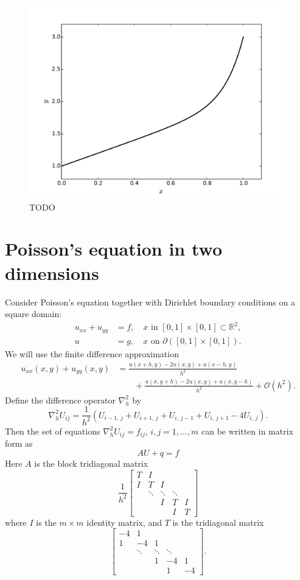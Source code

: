 \begin{figure}[ht]
\centering
\includegraphics[width=12cm]{figure2.pdf}
\caption{TODO}
\label{figure2}
\end{figure}



\section{Poisson's equation in two dimensions}

 Consider Poisson's equation together with Dirichlet boundary conditions on a square domain:
 \begin{align*}
 	u_{xx} + u_{yy} &= f,\quad x \text{ in } [0,1]\times[0,1] \subset \mathbb{R}^2,\\
 	u &= g, \quad x \text{ on } \partial \left( [0,1]\times[0,1]\right).
 \end{align*}
 We will use the finite difference approximation
 \begin{align*}
 u_{xx}(x,y) + u_{yy}(x,y) &= \frac{u(x+h,y) - 2u(x,y)+ u(x-h,y)}{h^2} \\
 & \qquad{}+ 
 \frac{u(x,y+h) - 2u(x,y)+ u(x,y-h)}{h^2} + \mathcal{O}(h^2).
 \end{align*}
 Define the difference operator $\nabla^2_h$ by 
 \[
 \nabla^2_h U_{ij} = \frac{1}{h^2}(U_{i-1,\,j} + U_{i+1,\,j} + U_{i,\,j-1} + U_{i,\,j+1}-4U_{i,\,j}).
 \]
 Then the set of equations  $\nabla^2_h U_{ij} = f_{ij}$, $i,j = 1,\ldots,m$ can be written in matrix form as
 $$AU + q  = f$$
 Here $A$ is the block tridiagonal matrix 
 \[
 \frac{1}{h^2} \begin{bmatrix}T & I & &  &\\ I &T & I & &\\  &\ddots  & \ddots & \ddots & \\  &  & I & T & I \\
  &  &  & I & T
 \end{bmatrix}
 \]
 where $I$ is the $m\times m$ identity matrix, and $T$ is the tridiagonal matrix
 \[
  \begin{bmatrix}-4 & 1 & &  &\\ 1 &-4 & 1 & &\\  &\ddots  & \ddots & \ddots & \\  &  & 1 & -4 & 1 \\
  &  &  & 1 & -4
 \end{bmatrix}.
 \]

